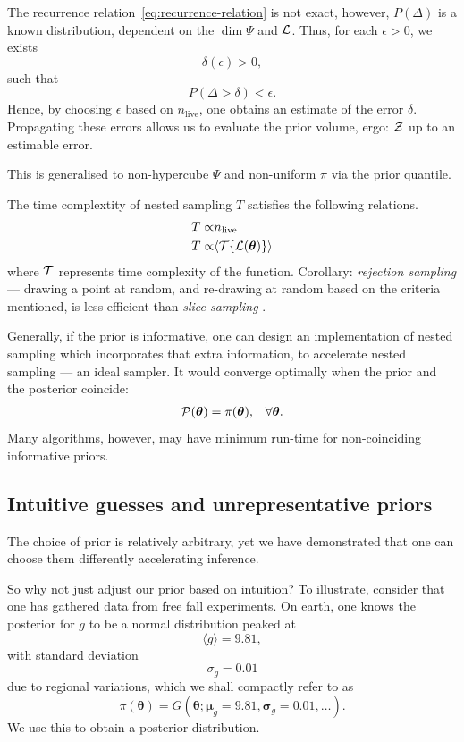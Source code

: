 \documentclass[usenatbib]{mnras}
\begin{document}
The recurrence relation~\eqref{eq:recurrence-relation} is not exact,
however, \(P(\Delta)\) is a known distribution, dependent on the
\(\dim \Psi\) and \({\cal L}\). Thus, for each \(\epsilon>0\), we
exists
\[\delta(\epsilon) >0,\] such that \[P(\Delta > \delta)<\epsilon.\]
Hence, by choosing \(\epsilon\) based on \(n_\text{live}\), one
obtains an estimate of the error \(\delta\). Propagating these errors
allows us to evaluate the prior volume, ergo: ${\cal Z}$ up to an
estimable error.

This is generalised to non-hypercube $\Psi$ and non-uniform $\pi$ via
the prior quantile. 

The time complextity of nested sampling $T$ satisfies the following
relations.
\begin{subequations}\label{eq:complexity}
  \begin{align}
    T \propto & n_\text{live}\\
    T \propto & \langle {\cal T}\{{\cal L}(\bm{\theta})\} \rangle
  \end{align}
\end{subequations}
where ${\cal T}$ represents time complexity of the
function. Corollary: \emph{rejection sampling} --- drawing a point at random,
and re-drawing at random based on the criteria mentioned, is less
efficient than \emph{slice sampling} \citep{Neal_2003}.

Generally, if the prior is informative, one can design an
implementation of nested sampling which incorporates that extra
information, to accelerate nested sampling --- an ideal sampler. It
would converge optimally when the prior and the posterior coincide:
\begin{equation}
\begin{array}{rl} 
{\cal P}(\bm{\theta}) = \pi(\bm{\theta}), & \forall \bm{\theta}. 
\end{array}
\end{equation}
Many algorithms, however, may have minimum run-time for non-coinciding
informative priors.

\subsection{Intuitive guesses and unrepresentative
  priors\label{discussion-bias}}
The choice of prior is relatively arbitrary, yet we have
demonstrated that one can choose them differently accelerating
inference.

So why not just adjust our prior based on intuition?  To illustrate,
consider that one has gathered data from free fall experiments. On
earth, one knows the posterior for \(g\) to be a normal distribution
peaked at \[\langle g \rangle=9.81,\] with standard
deviation \[\sigma_{g} = 0.01\] due to regional variations, which we
shall compactly refer to as
\begin{equation*}
  \pi(\bm{\theta}) = G(\bm{\theta};\bm{\mu}_{g}=9.81, \bm{\sigma}_{g}=0.01, \ldots ).
\end{equation*}
We use this to obtain a posterior distribution.
\end{document}

